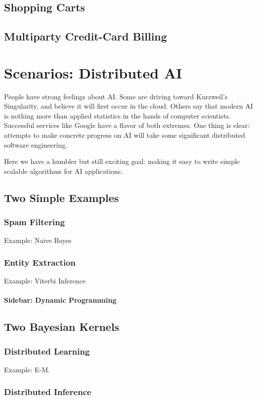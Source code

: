 \documentclass[]{book}
\begin{document}
    \section{Shopping Carts}
    \section{Multiparty Credit-Card Billing}
    
\chapter{Scenarios: Distributed AI}
People have strong feelings about AI.  Some are driving toward Kurzweil's Singularity, and believe it will first occur in the cloud.  Others say that modern AI is nothing more than applied statistics in the hands of computer scientists.  Successful services like Google have a flavor of both extremes.  One thing is clear: attempts to make concrete progress on AI will take some significant distributed software engineering.

Here we have a humbler but still exciting goal: making it easy to write simple scalable algorithms for AI applications.

    \section{Two Simple Examples}
        \subsection{Spam Filtering}
        Example: Naive Bayes
        \subsection{Entity Extraction}
        Example: Viterbi Inference
        \subsubsection{Sidebar: Dynamic Programming}
    \section{Two Bayesian Kernels}
        \subsection{Distributed Learning}
        Example: E-M.
        \subsection{Distributed Inference}
\end{document}
